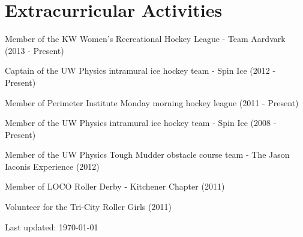 \documentclass[letterpaper]{article}
\def\footerlink{http://jblevins.org/projects/cv-template/}
\renewenvironment{itemize}{
  \begin{list}{}{
    \setlength{\leftmargin}{1.5em}
  }
}{
  \end{list}
}
\begin{document}
\section*{Extracurricular Activities}

\begin{itemize}

\item Member of the KW Women's Recreational Hockey League - Team Aardvark (2013 - Present)
\item Captain of the UW Physics intramural ice hockey team - Spin Ice (2012 - Present)
\item Member of Perimeter Institute Monday morning hockey league (2011 - Present)
\item Member of the UW Physics intramural ice hockey team - Spin Ice (2008 - Present)
\item Member of the UW Physics Tough Mudder obstacle course team - The Jason Iaconis Experience (2012)
\item Member of LOCO Roller Derby - Kitchener Chapter (2011)
\item Volunteer for the Tri-City Roller Girls (2011)

\end{itemize}

\bigskip

\begin{center}
  \begin{footnotesize}
    Last updated: \today \\
  \end{footnotesize}
\end{center}
\end{document}
